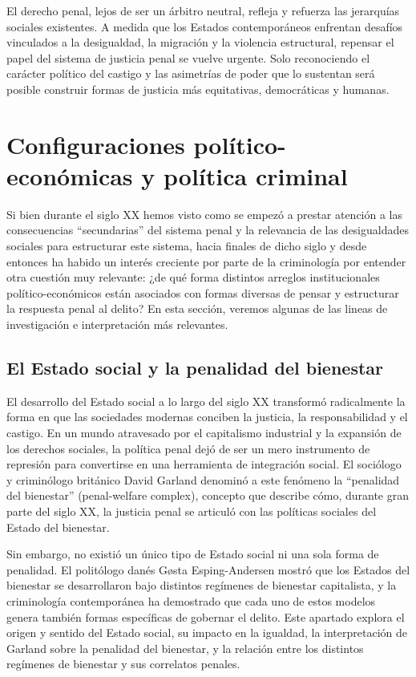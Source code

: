 \documentclass[
  spanish,
  letterpaper,
  DIV=11,
  numbers=noendperiod]{scrreprt}
\begin{document}
El derecho penal, lejos de ser un árbitro neutral, refleja y refuerza
las jerarquías sociales existentes. A medida que los Estados
contemporáneos enfrentan desafíos vinculados a la desigualdad, la
migración y la violencia estructural, repensar el papel del sistema de
justicia penal se vuelve urgente. Solo reconociendo el carácter político
del castigo y las asimetrías de poder que lo sustentan será posible
construir formas de justicia más equitativas, democráticas y humanas.

\section{Configuraciones político-económicas y política
criminal}\label{configuraciones-poluxedtico-econuxf3micas-y-poluxedtica-criminal}

Si bien durante el siglo XX hemos visto como se empezó a prestar
atención a las consecuencias ``secundarias'' del sistema penal y la
relevancia de las desigualdades sociales para estructurar este sistema,
hacia finales de dicho siglo y desde entonces ha habido un interés
creciente por parte de la criminología por entender otra cuestión muy
relevante: ¿de qué forma distintos arreglos institucionales
político-económicos están asociados con formas diversas de pensar y
estructurar la respuesta penal al delito? En esta sección, veremos
algunas de las lineas de investigación e interpretación más relevantes.

\subsection{El Estado social y la penalidad del
bienestar}\label{el-estado-social-y-la-penalidad-del-bienestar}

El desarrollo del Estado social a lo largo del siglo XX transformó
radicalmente la forma en que las sociedades modernas conciben la
justicia, la responsabilidad y el castigo. En un mundo atravesado por el
capitalismo industrial y la expansión de los derechos sociales, la
política penal dejó de ser un mero instrumento de represión para
convertirse en una herramienta de integración social. El sociólogo y
criminólogo británico David Garland denominó a este fenómeno la
``penalidad del bienestar'' (penal-welfare complex), concepto que
describe cómo, durante gran parte del siglo XX, la justicia penal se
articuló con las políticas sociales del Estado del bienestar.

Sin embargo, no existió un único tipo de Estado social ni una sola forma
de penalidad. El politólogo danés Gøsta Esping-Andersen mostró que los
Estados del bienestar se desarrollaron bajo distintos regímenes de
bienestar capitalista, y la criminología contemporánea ha demostrado que
cada uno de estos modelos genera también formas específicas de gobernar
el delito. Este apartado explora el origen y sentido del Estado social,
su impacto en la igualdad, la interpretación de Garland sobre la
penalidad del bienestar, y la relación entre los distintos regímenes de
bienestar y sus correlatos penales.
\end{document}

